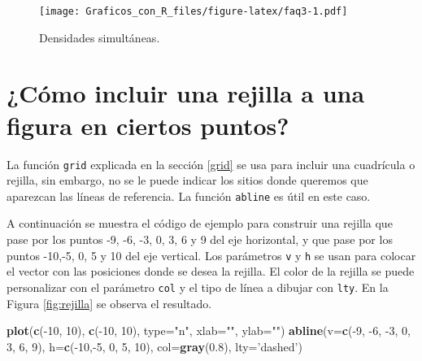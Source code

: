 \documentclass[10pt,]{krantz}
\makeatletter
\newenvironment{Shaded}{\begin{snugshade}}{\end{snugshade}}
\newcommand{\KeywordTok}[1]{\textcolor[rgb]{0.13,0.29,0.53}{\textbf{{#1}}}}
\newcommand{\DataTypeTok}[1]{\textcolor[rgb]{0.13,0.29,0.53}{{#1}}}
\newcommand{\DecValTok}[1]{\textcolor[rgb]{0.00,0.00,0.81}{{#1}}}
\newcommand{\FloatTok}[1]{\textcolor[rgb]{0.00,0.00,0.81}{{#1}}}
\newcommand{\StringTok}[1]{\textcolor[rgb]{0.31,0.60,0.02}{{#1}}}
\newcommand{\NormalTok}[1]{{#1}}
\newenvironment{kframe}{%
\medskip{}
\setlength{\fboxsep}{.8em}
 \def\at@end@of@kframe{}%
 \ifinner\ifhmode%
  \def\at@end@of@kframe{\end{minipage}}%
  \begin{minipage}{\columnwidth}%
 \fi\fi%
 \def\FrameCommand##1{\hskip\@totalleftmargin \hskip-\fboxsep
 \colorbox{shadecolor}{##1}\hskip-\fboxsep
     \hskip-\linewidth \hskip-\@totalleftmargin \hskip\columnwidth}%
 \MakeFramed {\advance\hsize-\width
   \@totalleftmargin\z@ \linewidth\hsize
   \@setminipage}}%
 {\par\unskip\endMakeFramed%
 \at@end@of@kframe}
\renewenvironment{Shaded}{\begin{kframe}}{\end{kframe}}
\makeatother
\begin{document}
\begin{figure}[htbp]
\centering
\texttt{[image: Graficos\_con\_R\_files/figure-latex/faq3-1.pdf]}
\caption{\label{fig:faq3}Densidades simultáneas.}
\end{figure}

\section{¿Cómo incluir una rejilla a una figura en ciertos
puntos?}\label{como-incluir-una-rejilla-a-una-figura-en-ciertos-puntos}

La función \texttt{grid} explicada en la sección \ref{grid} se usa para
incluir una cuadrícula o rejilla, sin embargo, no se le puede indicar
los sitios donde queremos que aparezcan las líneas de referencia. La
función \texttt{abline} es útil en este caso.

A continuación se muestra el código de ejemplo para construir una
rejilla que pase por los puntos -9, -6, -3, 0, 3, 6 y 9 del eje
horizontal, y que pase por los puntos -10,-5, 0, 5 y 10 del eje
vertical. Los parámetros \texttt{v} y \texttt{h} se usan para colocar el
vector con las posiciones donde se desea la rejilla. El color de la
rejilla se puede personalizar con el parámetro \texttt{col} y el tipo de
línea a dibujar con \texttt{lty}. En la Figura \ref{fig:rejilla} se
observa el resultado.

\begin{Shaded}
\begin{Highlighting}[]
\KeywordTok{plot}\NormalTok{(}\KeywordTok{c}\NormalTok{(-}\DecValTok{10}\NormalTok{, }\DecValTok{10}\NormalTok{), }\KeywordTok{c}\NormalTok{(-}\DecValTok{10}\NormalTok{, }\DecValTok{10}\NormalTok{), }\DataTypeTok{type=}\StringTok{"n"}\NormalTok{, }\DataTypeTok{xlab=}\StringTok{""}\NormalTok{, }\DataTypeTok{ylab=}\StringTok{""}\NormalTok{)}
\KeywordTok{abline}\NormalTok{(}\DataTypeTok{v=}\KeywordTok{c}\NormalTok{(-}\DecValTok{9}\NormalTok{, -}\DecValTok{6}\NormalTok{, -}\DecValTok{3}\NormalTok{, }\DecValTok{0}\NormalTok{, }\DecValTok{3}\NormalTok{, }\DecValTok{6}\NormalTok{, }\DecValTok{9}\NormalTok{),}
       \DataTypeTok{h=}\KeywordTok{c}\NormalTok{(-}\DecValTok{10}\NormalTok{,-}\DecValTok{5}\NormalTok{, }\DecValTok{0}\NormalTok{, }\DecValTok{5}\NormalTok{, }\DecValTok{10}\NormalTok{), }\DataTypeTok{col=}\KeywordTok{gray}\NormalTok{(}\FloatTok{0.8}\NormalTok{), }\DataTypeTok{lty=}\StringTok{'dashed'}\NormalTok{)}
\end{Highlighting}
\end{Shaded}
\end{document}
